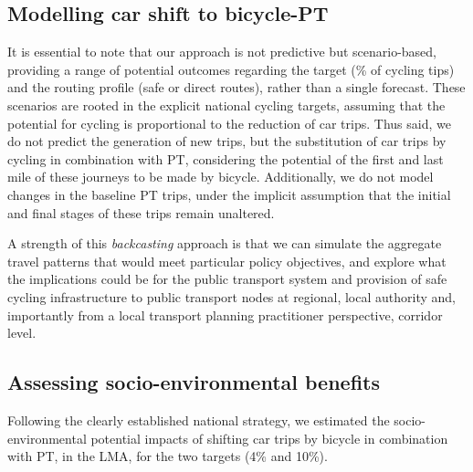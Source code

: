\documentclass[review, doubleblind, 3p,
authoryear]{elsarticle} %
\begin{document}
\subsection{Modelling car shift to
bicycle-PT}\label{modelling-car-shift-to-bicycle-pt}

It is essential to note that our approach is not predictive but
scenario-based, providing a range of potential outcomes regarding the
target (\% of cycling tips) and the routing profile (safe or direct
routes), rather than a single forecast. These scenarios are rooted in
the explicit national cycling targets, assuming that the potential for
cycling is proportional to the reduction of car trips. Thus said, we do
not predict the generation of new trips, but the substitution of car
trips by cycling in combination with PT, considering the potential of
the first and last mile of these journeys to be made by bicycle.
Additionally, we do not model changes in the baseline PT trips, under
the implicit assumption that the initial and final stages of these trips
remain unaltered.

A strength of this \emph{backcasting} approach is that we can simulate
the aggregate travel patterns that would meet particular policy
objectives, and explore what the implications could be for the public
transport system and provision of safe cycling infrastructure to public
transport nodes at regional, local authority and, importantly from a
local transport planning practitioner perspective, corridor level.

\subsection{Assessing socio-environmental
benefits}\label{assessing-socio-environmental-benefits}

Following the clearly established national strategy, we estimated the
socio-environmental potential impacts of shifting car trips by bicycle
in combination with PT, in the LMA, for the two targets (4\% and 10\%).
\end{document}
